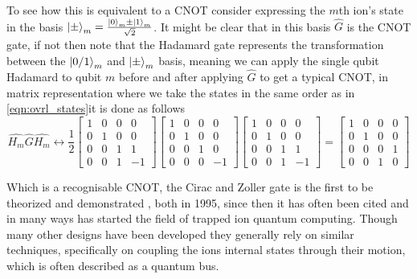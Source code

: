 To see how this is equivalent to a CNOT consider expressing the $m$th ion's state in the basis $\ket{\pm}_m = \frac{\ket{0}_m \pm \ket{1}_m}{\sqrt{2}}$.
It might be clear that in this basis $\hat{G}$ is the CNOT gate, if not then note that the Hadamard gate represents the transformation between the $\ket{0/1}_m$ and $\ket{\pm}_m$ basis, meaning we can apply the single qubit Hadamard to qubit $m$ before and after applying $\hat{G}$ to get a typical CNOT, in matrix representation where we take the states in the same order as in \cref{eqn:ovrl_states}\footnotemark it is done as follows
\begin{equation}
    \hat{H_m}\hat{G}\hat{H_m} \leftrightarrow \frac{1}{2}
    \begin{bmatrix}
        1 & 0 & 0 & 0 \\
        0 & 1 & 0 & 0 \\
        0 & 0 & 1 & 1 \\
        0 & 0 & 1 & -1
    \end{bmatrix}
    \begin{bmatrix}
        1 & 0 & 0 & 0 \\
        0 & 1 & 0 & 0 \\
        0 & 0 & 1 & 0 \\
        0 & 0 & 0 & -1
    \end{bmatrix}
    \begin{bmatrix}
        1 & 0 & 0 & 0 \\
        0 & 1 & 0 & 0 \\
        0 & 0 & 1 & 1 \\
        0 & 0 & 1 & -1
    \end{bmatrix} = 
    \begin{bmatrix}
        1 & 0 & 0 & 0 \\
        0 & 1 & 0 & 0 \\
        0 & 0 & 0 & 1 \\
        0 & 0 & 1 & 0
    \end{bmatrix}
\end{equation}


Which is a recognisable CNOT, the Cirac and Zoller gate is the first to be theorized and demonstrated \cite{monroeDemonstrationFundamentalQuantum1995}, both in 1995, since then it has often been cited and in many ways has started the field of trapped ion quantum computing\cite{bruzewiczTrappedionQuantumComputing2019}.
Though many other designs have been developed they generally rely on similar techniques, specifically on coupling the ions internal states through their motion, which is often described as a quantum bus.

